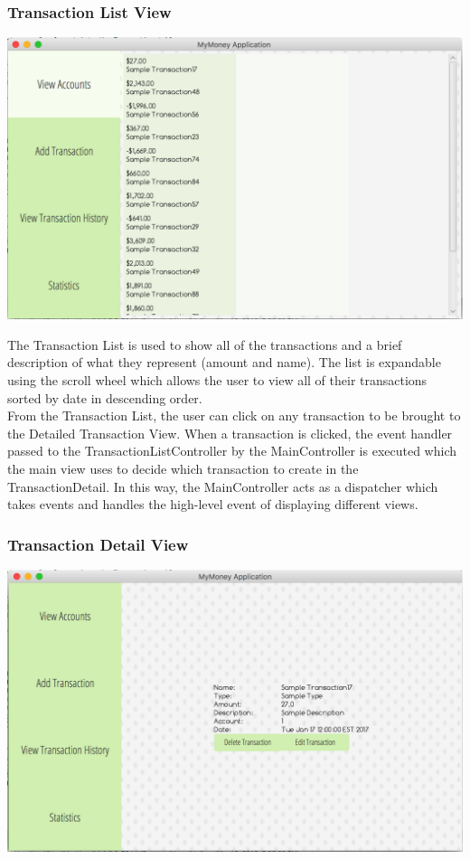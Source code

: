 \documentclass[12pt]{article}
\begin{document}
\subsubsection{Transaction List View}

\includegraphics[scale=0.2]{transactionlist}

The Transaction List is used to show all of the transactions and a brief
description of what they represent (amount and name). The list is
expandable using the scroll wheel which allows the user to view all of
their transactions sorted by date in descending order.\\

From the Transaction List, the user can click on any transaction to be
brought to the Detailed Transaction View. When a transaction is clicked,
the event handler passed to the TransactionListController by the MainController
is executed which the main view uses to decide which transaction to create in the
TransactionDetail. In this way, the MainController acts as a dispatcher which takes
events and handles the high-level event of displaying different views.

\subsubsection{Transaction Detail View}
\includegraphics[scale=0.2]{transactiondetail}
\end{document}
